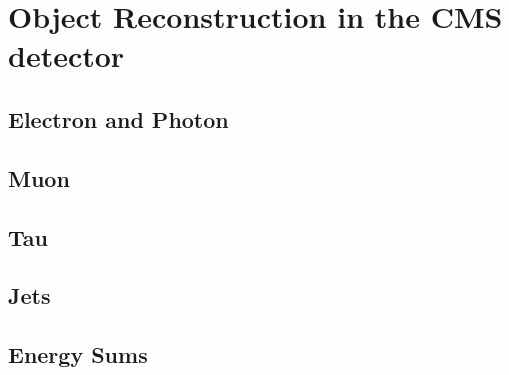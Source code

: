 \chapter{Object Reconstruction in the CMS detector}
\label{chap:Reco}

\section{Electron and Photon}
\label{sec:Electron}

\section{Muon}
\label{sec:Muon}

\section{Tau}
\label{sec:Tau}

\section{Jets}
\label{sec:Jet}

\section{Energy Sums}
\label{sec:MET}